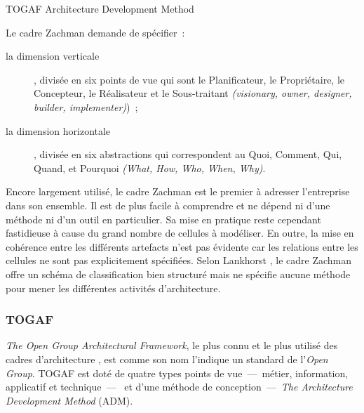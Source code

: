 \begin{table}[!ht]
    \vspace*{0.4cm}
    
    \caption{TOGAF Architecture Development Method 
    \protect\cite{zachman1987framework}}
    \label{fig:Zachman}
\end{table}

Le cadre Zachman demande de spécifier~:

\begin{description}

    \item[la dimension verticale], divisée en six points de vue qui sont le
    Planificateur, le Propriétaire, le Concepteur, le Réalisateur et le
    Sous-traitant \textit{(visionary, owner, designer, builder,
    implementer)})~;

    \item[la dimension horizontale], divisée en six abstractions qui
    correspondent au Quoi, Comment, Qui, Quand, et Pourquoi \textit{(What, How,
    Who, When, Why)}.

\end{description}	

Encore largement utilisé, le cadre Zachman est le premier à adresser
l'entreprise dans son ensemble. Il est de plus facile à comprendre et ne dépend
ni d'une méthode ni d'un outil en particulier. Sa mise en pratique reste
cependant fastidieuse à cause du grand nombre de cellules à modéliser. En
outre, la mise en cohérence entre les différents artefacts n'est pas évidente
car les relations entre les cellules ne sont pas explicitement spécifiées.
Selon Lankhorst \cite{lankhorst2013enterprise}, le cadre Zachman offre un
schéma de classification bien structuré mais ne spécifie aucune méthode pour
mener les différentes activités d'architecture.

\subsubsection{TOGAF} 

\textit{The Open Group Architectural Framework}, le plus connu et le plus
utilisé des cadres d'architecture \cite{winter2008enterprise}, est comme son
nom l'indique un standard de l'\textit{Open Group}. TOGAF est doté de quatre
types points de vue~—~métier, information, applicatif et technique~—~ et d'une
méthode de conception~—~\textit{The Architecture Development Method} (ADM). 

